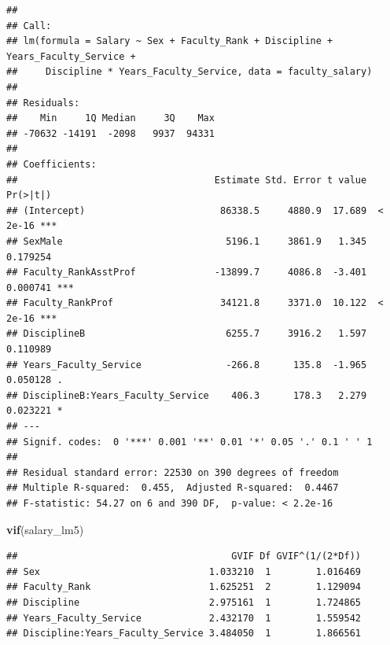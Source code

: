 \documentclass[]{article}
\newenvironment{Shaded}{\begin{snugshade}}{\end{snugshade}}
\newcommand{\KeywordTok}[1]{\textcolor[rgb]{0.13,0.29,0.53}{\textbf{#1}}}
\newcommand{\NormalTok}[1]{#1}
\begin{document}
\begin{verbatim}
## 
## Call:
## lm(formula = Salary ~ Sex + Faculty_Rank + Discipline + Years_Faculty_Service + 
##     Discipline * Years_Faculty_Service, data = faculty_salary)
## 
## Residuals:
##    Min     1Q Median     3Q    Max 
## -70632 -14191  -2098   9937  94331 
## 
## Coefficients:
##                                   Estimate Std. Error t value Pr(>|t|)    
## (Intercept)                        86338.5     4880.9  17.689  < 2e-16 ***
## SexMale                             5196.1     3861.9   1.345 0.179254    
## Faculty_RankAsstProf              -13899.7     4086.8  -3.401 0.000741 ***
## Faculty_RankProf                   34121.8     3371.0  10.122  < 2e-16 ***
## DisciplineB                         6255.7     3916.2   1.597 0.110989    
## Years_Faculty_Service               -266.8      135.8  -1.965 0.050128 .  
## DisciplineB:Years_Faculty_Service    406.3      178.3   2.279 0.023221 *  
## ---
## Signif. codes:  0 '***' 0.001 '**' 0.01 '*' 0.05 '.' 0.1 ' ' 1
## 
## Residual standard error: 22530 on 390 degrees of freedom
## Multiple R-squared:  0.455,  Adjusted R-squared:  0.4467 
## F-statistic: 54.27 on 6 and 390 DF,  p-value: < 2.2e-16
\end{verbatim}

\begin{Shaded}
\begin{Highlighting}[]
\KeywordTok{vif}\NormalTok{(salary_lm5)}
\end{Highlighting}
\end{Shaded}

\begin{verbatim}
##                                      GVIF Df GVIF^(1/(2*Df))
## Sex                              1.033210  1        1.016469
## Faculty_Rank                     1.625251  2        1.129094
## Discipline                       2.975161  1        1.724865
## Years_Faculty_Service            2.432170  1        1.559542
## Discipline:Years_Faculty_Service 3.484050  1        1.866561
\end{verbatim}
\end{document}
